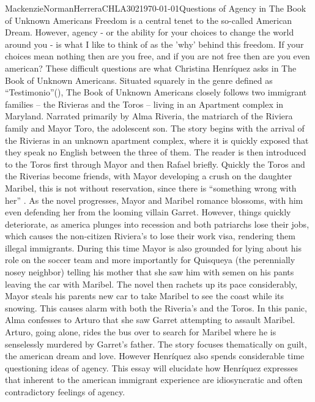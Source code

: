 \documentclass{article}
\begin{document}
\begin{mla}{Mackenzie}{Norman}{Herrera}{CHLA302}{\today}{Questions of Agency in The Book of Unknown Americans}
Freedom is a central tenet to the so-called American Dream. However, agency - or the ability for your choices to change the world around you - is what I like to think of as the 'why' behind this freedom. If your choices mean nothing then are you free, and if you are not free then are you even american? These difficult questions are what Christina Henríquez asks in The Book of Unknown Americans. Situated squarely in the genre defined as ``Testimonio''(\cite{testimonio}), The Book of Unknown Americans closely follows two immigrant families -- the Rivieras and the Toros -- living in an Apartment complex in Maryland. Narrated primarily by Alma Riveria, the matriarch of the Riviera family and Mayor Toro, the adolescent son. The story begins with the arrival of the Rivieras in an unknown apartment complex, where it is quickly exposed that they speak no English between the three of them. The reader is then introduced to the Toros first through Mayor and then Rafael briefly. Quickly the Toros and the Riverias become friends, with Mayor developing a crush on the daughter Maribel, this is not without reservation, since there is ``something wrong with her'' . As the novel progresses, Mayor and Maribel romance blossoms, with him even defending her from the looming villain Garret. However, things quickly deteriorate, as america plunges into recession and both patriarchs lose their jobs, which causes the non-citizen Riviera's to lose their work visa, rendering them illegal immigrants. During this time Mayor is also grounded for lying about his role on the soccer team and more importantly for Quisqueya (the perennially nosey neighbor) telling his mother that she saw him with semen on his pants leaving the car with Maribel. The novel then rachets up its pace considerably, Mayor steals his parents new car to take Maribel to see the coast while its snowing. This causes alarm with both the Riveria's and the Toros. In this panic, Alma confesses to Arturo that she saw Garret attempting to assault Maribel. Arturo, going alone, rides the bus over to search for Maribel where he is senselessly murdered by Garret's father. The story focuses thematically on guilt, the american dream and love. However Henríquez also spends considerable time questioning ideas of agency. This essay will elucidate how Henríquez expresses that inherent to the american immigrant experience are idiosyncratic and often contradictory feelings of agency.


\end{mla}
\end{document}
